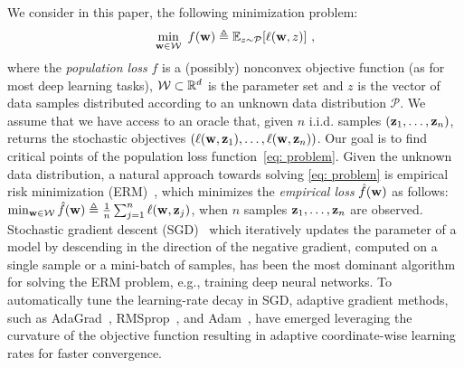 \documentclass[11pt]{article}
\begin{document}
We consider in this paper, the following minimization problem:
\begin{equation} \label{eq: problem}
 \min_{\w \in \cW}~ f({\w})  \triangleq {\mathbb{E}_{z \sim \mathcal{P}}}[\ell(\w,z)]~,
\end{equation}
where the \emph{population loss} $f$ is a (possibly) nonconvex objective function (as for most deep learning tasks), $\cW \subset \R^d$ is the parameter set and $z$ is the vector of data samples distributed according to an unknown data distribution $\mathcal{P}$. 
We assume that we have access to an oracle that, given $n $ i.i.d. samples $(\mathbf{z}_{1}, \dots, \mathbf{z}_{n})$, returns the stochastic objectives $(\ell(\mathbf{w},\mathbf{z}_{1}), \dots, \ell(\mathbf{w},\mathbf{z}_{n}))$.
Our goal is to find critical points of the population loss function~\eqref{eq: problem}.
Given the unknown data distribution, a natural approach towards solving \eqref{eq: problem} is empirical risk minimization (ERM)~\citep{shbe14}, which minimizes the \emph{empirical loss} $\hat f(\mathbf{w})$ as follows: $\min_{\w \in \cW}     \hat f(\w)  \triangleq \frac{1}{n}\sum_{j =1}^{n} \ell(\w, \z_j)$, when $n$ samples $\mathbf{z}_{1}, \dots, \mathbf{z}_{n}$ are observed.
Stochastic gradient descent (SGD)~\citep{romo51} which iteratively updates the parameter of a model by descending in the direction of the negative gradient, computed on a single sample or a mini-batch of samples, has been the most dominant algorithm for solving the ERM problem, e.g., training deep neural networks. 
To automatically tune the learning-rate decay in SGD, adaptive gradient methods, such as AdaGrad~\citep{duha11}, RMSprop~\citep{tige12}, and Adam~\citep{kiba15}, have emerged leveraging the curvature of the objective function resulting in adaptive coordinate-wise learning rates for faster convergence.
\end{document}
